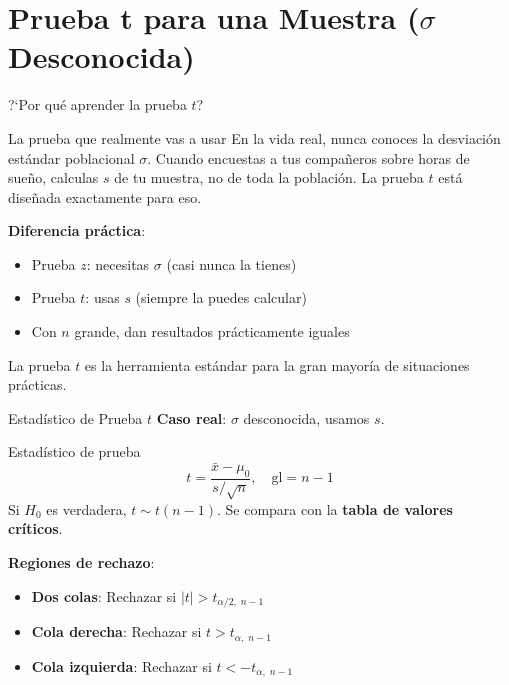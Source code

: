 \documentclass[aspectratio=169, 11pt]{beamer}
\begin{document}
\section{Prueba t para una Muestra ($\sigma$ Desconocida)}

\begin{frame}{?`Por qu\'e aprender la prueba $t$?}
\small
\begin{exampleblock}{La prueba que realmente vas a usar}
En la vida real, \alert{nunca} conoces la desviaci\'on est\'andar poblacional $\sigma$. Cuando encuestas a tus compa\~neros sobre horas de sue\~no, calculas $s$ de tu muestra, no de toda la poblaci\'on. La prueba $t$ est\'a dise\~nada exactamente para eso.
\end{exampleblock}

\vspace{0.2cm}
\textbf{Diferencia pr\'actica}:
\begin{itemize}\setlength{\itemsep}{1pt}
  \item Prueba $z$: necesitas $\sigma$ (casi nunca la tienes)
  \item Prueba $t$: usas $s$ (siempre la puedes calcular)
  \item Con $n$ grande, dan resultados pr\'acticamente iguales
\end{itemize}

\vspace{0.1cm}
La prueba $t$ es la herramienta est\'andar para la gran mayor\'ia de situaciones pr\'acticas.
\end{frame}

\begin{frame}{Estad\'istico de Prueba $t$}
\textbf{Caso real}: $\sigma$ desconocida, usamos $s$.

\vspace{0.3cm}
\begin{block}{Estad\'istico de prueba}
\[
t = \frac{\bar{x} - \mu_0}{s / \sqrt{n}}, \quad \text{gl} = n - 1
\]
Si $H_0$ es verdadera, $t \sim t(n-1)$. Se compara con la \textbf{tabla de valores cr\'iticos}.
\end{block}

\vspace{0.3cm}
\textbf{Regiones de rechazo}:
\begin{itemize}
  \item \textbf{Dos colas}: Rechazar si $|t| > t_{\alpha/2,\; n-1}$
  \item \textbf{Cola derecha}: Rechazar si $t > t_{\alpha,\; n-1}$
  \item \textbf{Cola izquierda}: Rechazar si $t < -t_{\alpha,\; n-1}$
\end{itemize}
\end{frame}
\end{document}

